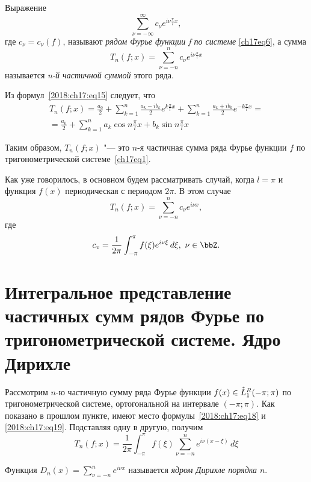 \begin{defn}
Выражение
\begin{equation}
\sum_{\nu = -\infty}^{\infty} c_{\nu}e^{i\nu\frac{\pi}{l}x},
\end{equation}
где $c_{\nu} = c_{\nu}(f)$, называют \textit{рядом Фурье функции f по системе} \eqref{ch17eq6}, а сумма
\begin{equation}
T_{n}(f;x) = \sum_{\nu = -n}^{n} c_{\nu}e^{i\nu\frac{\pi}{l}x}
\end{equation}
называется \textit{n-й частичной суммой} этого ряда.
\end{defn}

Из формул~\eqref{2018:ch17:eq15} следует, что
\begin{multline*}
T_{n}(f;x) = \frac{a_0}{2} + \sum_{k = 1}^{n} \frac{a_k-ib_k}{2} e^{k\frac{\pi}{l}x} + \sum_{k = 1}^{n} \frac{a_k + ib_k}{2} e^{-k\frac{\pi}{l}x} =\\ = \frac{a_0}{2} + \sum_{k = 1}^{n} a_{k} \cos n\frac{\pi}{l}x + b_{k} \sin n\frac{\pi}{l}x
\end{multline*}

Таким образом, $T_{n}(f;x)$ "--- это $n$-я частичная сумма ряда Фурье функции $f$ по тригонометрической системе~\eqref{ch17eq1}.

Как уже говорилось, в основном будем рассматривать случай, когда $l=\pi$ и функция $f(x)$ периодическая с периодом $2\pi$. В этом случае
\begin{equation}\label{2018:ch17:eq18}
T_{n}(f;x) = \sum_{\nu = -n}^{n} c_{\nu}e^{i\nu x},
\end{equation}
где
\begin{equation}\label{2018:ch17:eq19}
c_v = \frac{1}{2\pi} \int_{-\pi}^{\pi} f(\xi) e^{i\nu \xi}\,d\xi,\ \nu\in\bbZ.
\end{equation}

\section{Интегральное представление частичных сумм рядов Фурье по тригонометрической системе. Ядро Дирихле}

Рассмотрим $n$-ю частичную сумму ряда Фурье функции $f(x)\in \accentset{*}{L}^{R}_1(-\pi;\pi)$ по тригонометрической системе, ортогональной на интервале $(-\pi;\pi)$. Как показано в прошлом пункте, имеют место формулы~\eqref{2018:ch17:eq18} и  \eqref{2018:ch17:eq19}. Подставляя одну в другую, получим
$$
T_{n}(f;x) = \frac{1}{2\pi} \int_{-\pi}^{\pi} f(\xi) \sum_{\nu = -n}^{n} e^{i\nu(x-\xi)}\,d\xi
$$
\begin{defn}
Функция $D_n(x) = \sum_{\nu = -n}^{n} e^{i\nu x}$ называется \textit{ядром Дирихле порядка $n$}.
\end{defn}

